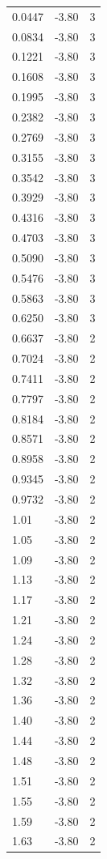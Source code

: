 \begin{longtable}{lrr}
  0.0447 & -3.80 & 3 \\
  0.0834 & -3.80 & 3 \\
  0.1221 & -3.80 & 3 \\
  0.1608 & -3.80 & 3 \\
  0.1995 & -3.80 & 3 \\
  0.2382 & -3.80 & 3 \\
  0.2769 & -3.80 & 3 \\
  0.3155 & -3.80 & 3 \\
  0.3542 & -3.80 & 3 \\
  0.3929 & -3.80 & 3 \\
  0.4316 & -3.80 & 3 \\
  0.4703 & -3.80 & 3 \\
  0.5090 & -3.80 & 3 \\
  0.5476 & -3.80 & 3 \\
  0.5863 & -3.80 & 3 \\
  0.6250 & -3.80 & 3 \\
  0.6637 & -3.80 & 2 \\
  0.7024 & -3.80 & 2 \\
  0.7411 & -3.80 & 2 \\
  0.7797 & -3.80 & 2 \\
  0.8184 & -3.80 & 2 \\
  0.8571 & -3.80 & 2 \\
  0.8958 & -3.80 & 2 \\
  0.9345 & -3.80 & 2 \\
  0.9732 & -3.80 & 2 \\
  1.01 & -3.80 & 2 \\
  1.05 & -3.80 & 2 \\
  1.09 & -3.80 & 2 \\
  1.13 & -3.80 & 2 \\
  1.17 & -3.80 & 2 \\
  1.21 & -3.80 & 2 \\
  1.24 & -3.80 & 2 \\
  1.28 & -3.80 & 2 \\
  1.32 & -3.80 & 2 \\
  1.36 & -3.80 & 2 \\
  1.40 & -3.80 & 2 \\
  1.44 & -3.80 & 2 \\
  1.48 & -3.80 & 2 \\
  1.51 & -3.80 & 2 \\
  1.55 & -3.80 & 2 \\
  1.59 & -3.80 & 2 \\
  1.63 & -3.80 & 2 \\

\end{longtable}
